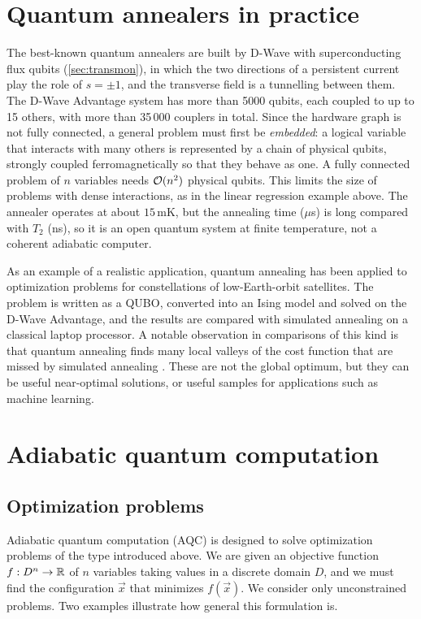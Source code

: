 \section{Quantum annealers in practice}
The best-known quantum annealers are built by D-Wave with superconducting flux qubits (\cref{sec:transmon}), in which the two directions of a persistent current play the role of $s=\pm1$, and the transverse field is a tunnelling
between them. The D-Wave Advantage system has more than 5000 qubits, each coupled to up to 15 others, with more than 35\,000 couplers in total. Since the hardware graph is not fully connected, a general problem must first be
\emph{embedded}: a logical variable that interacts with many others is represented by a chain of physical qubits, strongly coupled ferromagnetically so that they behave as one. A fully connected problem of $n$ variables needs
$\mathcal O(n^2)$ physical qubits. This limits the size of problems with dense interactions, as in the linear regression example above. The annealer operates at about $15$\,mK, but the annealing time ($\mu$s) is long compared with
$T_2$ (ns), so it is an open quantum system at finite temperature, not a coherent adiabatic computer.

As an example of a realistic application, quantum annealing has been applied to optimization problems for constellations of low-Earth-orbit satellites. The problem is written as a QUBO, converted into an Ising model and solved
on the D-Wave Advantage, and the results are compared with simulated annealing on a classical laptop processor. A notable observation in comparisons of this kind is that quantum annealing finds many local valleys of the cost
function that are missed by simulated annealing \cite{Koshka2019}. These are not the global optimum, but they can be useful near-optimal solutions, or useful samples for applications such as machine learning.

\section{Adiabatic quantum computation}
\subsection{Optimization problems}
Adiabatic quantum computation (AQC) \cite{Farhi2001} is designed to solve optimization problems of the type introduced above. We are given an objective function $f:D^n\to\mathbb R$ of $n$ variables taking values in a discrete domain $D$,
and we must find the configuration $\vec x$ that minimizes $f(\vec x)$. We consider only unconstrained problems. Two examples illustrate how general this formulation is.

